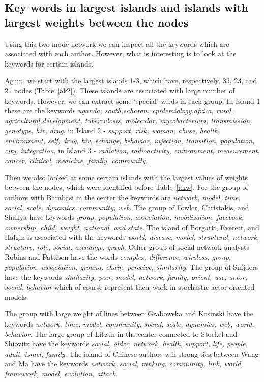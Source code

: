 \documentclass[11pt]{article} %
\begin{document}
\subsection{Key words in largest islands and islands with largest weights between the nodes}  

Using this two-mode network we can inspect all the keywords which are associated with each author. However, what is interesting is to look at the keywords for certain islands. \medskip

Again, we start with the largest islands 1-3, which have, respectively, 35, 23, and 21 nodes (Table~\ref{ak2}). These islands are associated with large number of keywords. However, we can extract some `special' wirds in each group. In Island 1 these are the keywords \textit{uganda, south,saharan, epidemiology,africa,  rural, agricultural,development, tuberculosis, molecular, mycobacterium, transmission, genotype, hiv, drug}, in Island 2 - \textit{support, risk, woman, abuse, health, environment, self, drug, hiv, echange, behavior, injection, transition, population, city, integration}, in Island 3 - \textit{radiation, radioactivity, environment, measurement, cancer, clinical, medicine, family, community}.  \medskip

Then we also looked at some certain islands with the largest values of weights between the nodes, which were identified before Table~\ref{akw}. For the group of authors with Barabasi in the center the keywords are \textit{network, model, time, social, scale, dynamics, community, web}. The group of Fowler, Christakis, and Shakya have keywords \textit{group, population, association, mobilization, facebook,  ownership, child, weight, national, and state}. The island of Borgatti,  Everett, and Halgin is associated with the keywords \textit{world, disease, model, structural, network, structure, role, social, exchange, graph}.  Other group of social network analysts Robins and Pattison have the words \textit{complex, difference, wireless, group, population, association, ground, chain, perceive, similarity}. The group of Snijders have the keywords \textit{similarity, peer, model, network, family, orient, use, actor, social, behavior} which of course represent their work in stochastic actor-oriented models. \medskip

The group with large weight of lines between Grabowska and Kosinski have the keywords \textit{network, time, model, community, social, scale, dynamics, web, world, behavior}. The large group of Litwin in the center connected to Stoekel and Shiovitz have the keywords \textit{social, older,  network, health, support, life, people, adult, israel, family}. The island of  Chinese authors wih strong ties between Wang and Ma have the keywords \textit{network, social, ranking, community, link, world, framework, model, evolution, attack}. \medskip
\end{document}
